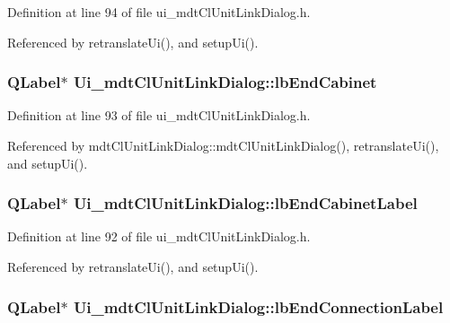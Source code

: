 Definition at line 94 of file ui\-\_\-mdt\-Cl\-Unit\-Link\-Dialog.\-h.



Referenced by retranslate\-Ui(), and setup\-Ui().

\hypertarget{class_ui__mdt_cl_unit_link_dialog_a945d4c2d44bc0de5d98b539d75ae4a94}{
\subsubsection[{lb\-End\-Cabinet}]{\setlength{\rightskip}{0pt plus 5cm}Q\-Label$\ast$ Ui\-\_\-mdt\-Cl\-Unit\-Link\-Dialog\-::lb\-End\-Cabinet}}\label{class_ui__mdt_cl_unit_link_dialog_a945d4c2d44bc0de5d98b539d75ae4a94}


Definition at line 93 of file ui\-\_\-mdt\-Cl\-Unit\-Link\-Dialog.\-h.



Referenced by mdt\-Cl\-Unit\-Link\-Dialog\-::mdt\-Cl\-Unit\-Link\-Dialog(), retranslate\-Ui(), and setup\-Ui().

\hypertarget{class_ui__mdt_cl_unit_link_dialog_afe972daff82047d4467c1107be8ebb9b}{
\subsubsection[{lb\-End\-Cabinet\-Label}]{\setlength{\rightskip}{0pt plus 5cm}Q\-Label$\ast$ Ui\-\_\-mdt\-Cl\-Unit\-Link\-Dialog\-::lb\-End\-Cabinet\-Label}}\label{class_ui__mdt_cl_unit_link_dialog_afe972daff82047d4467c1107be8ebb9b}


Definition at line 92 of file ui\-\_\-mdt\-Cl\-Unit\-Link\-Dialog.\-h.



Referenced by retranslate\-Ui(), and setup\-Ui().

\hypertarget{class_ui__mdt_cl_unit_link_dialog_aa099f7301abc6dfd2985dac22e5ff4de}{
\subsubsection[{lb\-End\-Connection\-Label}]{\setlength{\rightskip}{0pt plus 5cm}Q\-Label$\ast$ Ui\-\_\-mdt\-Cl\-Unit\-Link\-Dialog\-::lb\-End\-Connection\-Label}}\label{class_ui__mdt_cl_unit_link_dialog_aa099f7301abc6dfd2985dac22e5ff4de}


